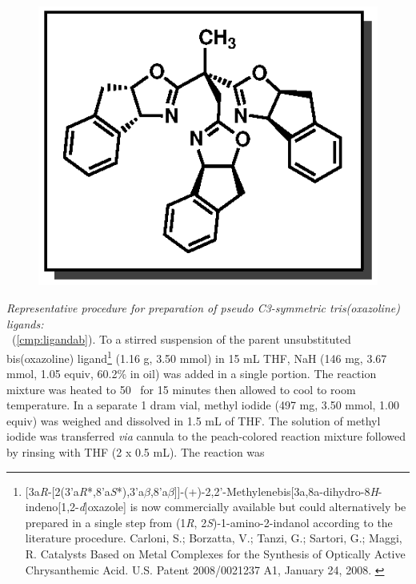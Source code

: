 \vspace{10pt}
\begin{figure}
  \vspace{-18pt}
  \begin{center}
    \includegraphics[scale=0.8]{chp_asymmetric/images/ligandab}
  \end{center}
  \vspace{-35pt}
\end{figure}
\noindent \textit{Representative procedure for preparation of pseudo C3-symmetric tris(oxazoline)
ligands:}\\ \textbf{\CMPligandab}\ (\ref{cmp:ligandab}).
To a stirred suspension of the parent unsubstituted bis(oxazoline) ligand\footnote{[3a\textit{R}-[2(3'a\textit{R}*,8'a\textit{S}*),3'a$\beta$,8'a$\beta$]]-(+)-2,2'-Methylenebis[3a,8a-dihydro-8\textit{H}-indeno[1,2-\textit{d}]oxazole] is now commercially available but could alternatively be prepared in a single step
from (1\textit{R}, 2\textit{S})-1-amino-2-indanol according to the literature procedure.
{\frenchspacing Carloni, S.; Borzatta, V.; Tanzi, G.; Sartori, G.; Maggi, R. Catalysts Based on Metal Complexes for
the Synthesis of Optically Active Chrysanthemic Acid. U.S. Patent 2008/0021237 A1, January 24,
2008.} \label{ref:indanylbox}} (1.16 g, 3.50 mmol) in 15 mL THF, NaH (146 mg, 3.67 mmol, 1.05 equiv,
60.2\% in oil) was added in a single portion. The reaction mixture was heated to 50 \degc\ for 15 minutes then allowed to cool to room temperature. In a separate 1 dram vial, methyl iodide (497 mg, 3.50 mmol, 1.00 equiv) was weighed and dissolved in 1.5 mL of THF. The solution of methyl iodide was transferred \textit{via} cannula to the peach-colored reaction mixture followed by rinsing with THF (2 x 0.5 mL).  The reaction was
